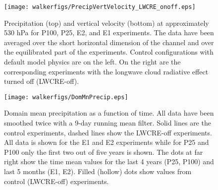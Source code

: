 \documentclass[draft]{agujournal2019}
\begin{document}
\begin{figure}
  \centering
      \texttt{[image: walkerfigs/PrecipVertVelocity\_LWCRE\_onoff.eps]}
  \caption{Precipitation (top) and vertical velocity (bottom) at approximately 530 hPa for P100, P25, E2, and E1 experiments.  
  The data have been averaged over the short horizontal dimension of the channel and over the 
  equilibrated part of the experiments.  Control configurations with default model physics are on the 
  left.  On the right are the corresponding experiments with the longwave cloud radiative effect turned
  off (LWCRE-off).}
  \label{fig:precip_vertvel}
\end{figure}
%
%
%

\begin{figure}
  \centering
      \texttt{[image: walkerfigs/DomMnPrecip.eps]}
  \caption{Domain mean precipitation as a function of time.  All data have been smoothed twice with a 9-day running mean filter.  
  Solid lines are the control experiments, dashed lines show the LWCRE-off experiments.  All data is shown for the E1 and E2 experiments
  while for P25 and P100 only the first two out of five years is shown.  The dots at far right show the time mean values for the last 4 years (P25, P100) and last 5 months (E1, E2).  Filled (hollow) dots show values from control (LWCRE-off) experiments. }
    \label{fig:precip_dom_mn}
\end{figure}
\end{document}
